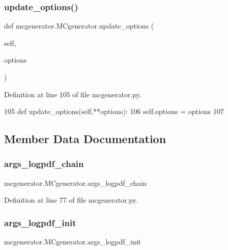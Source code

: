 \subsubsection{\texorpdfstring{update\+\_\+options()}{update\_options()}}
{\footnotesize\ttfamily def mcgenerator.\+M\+Cgenerator.\+update\+\_\+options (\begin{DoxyParamCaption}\item[{}]{self,  }\item[{}]{options }\end{DoxyParamCaption})}



Definition at line 105 of file mcgenerator.\+py.


\begin{DoxyCode}
105     \textcolor{keyword}{def }update\_options(self,**options):
106         self.options = options
107 
\end{DoxyCode}


\subsection{Member Data Documentation}
\mbox{\label{classmcgenerator_1_1MCgenerator_acf87301fa092616f385053a1a607e30a}} 
\subsubsection{\texorpdfstring{args\+\_\+logpdf\+\_\+chain}{args\_logpdf\_chain}}
{\footnotesize\ttfamily mcgenerator.\+M\+Cgenerator.\+args\+\_\+logpdf\+\_\+chain}



Definition at line 77 of file mcgenerator.\+py.

\mbox{\label{classmcgenerator_1_1MCgenerator_aaa09cf8b31cac60f08738f35fdd702e4}} 
\subsubsection{\texorpdfstring{args\+\_\+logpdf\+\_\+init}{args\_logpdf\_init}}
{\footnotesize\ttfamily mcgenerator.\+M\+Cgenerator.\+args\+\_\+logpdf\+\_\+init}



